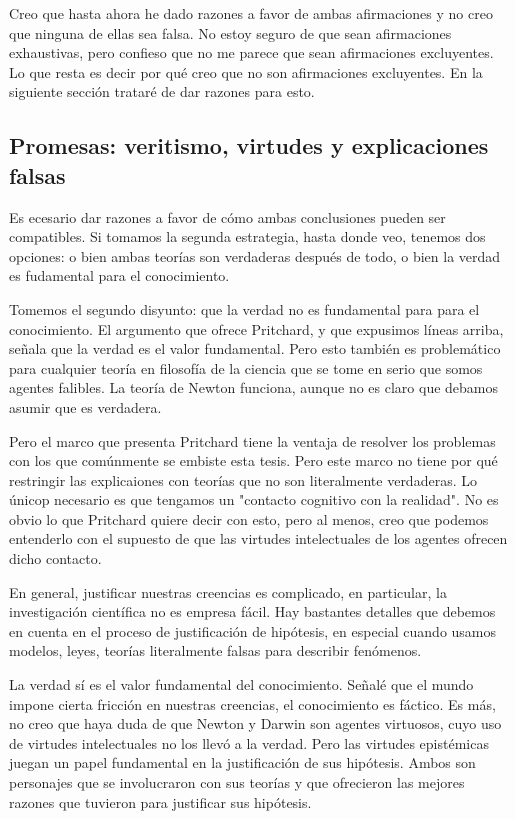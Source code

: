 {{{{{Creo que hasta ahora he dado razones a favor de ambas afirmaciones y no creo que ninguna de ellas sea falsa.
No estoy seguro de que sean afirmaciones exhaustivas, pero confieso que no me parece que sean afirmaciones excluyentes.
Lo que resta es decir por qué creo que no son afirmaciones excluyentes.
En la siguiente sección trataré de dar razones para esto.

\subsection{Promesas: veritismo, virtudes y explicaciones falsas}

Es ecesario dar razones a favor de cómo ambas conclusiones pueden ser compatibles.
Si tomamos la segunda estrategia, hasta donde veo, tenemos dos opciones: o bien ambas teorías son verdaderas después de todo, o bien la verdad es fudamental para el conocimiento.

Tomemos el segundo disyunto: que la verdad no es fundamental para para el conocimiento.
El argumento que ofrece Pritchard, y que expusimos líneas arriba, señala que la verdad es el valor fundamental.
Pero esto también es problemático para cualquier teoría en filosofía de la ciencia que se tome en serio que somos agentes falibles.
La teoría de Newton funciona, aunque no es claro que debamos asumir que es verdadera.

Pero el marco que presenta Pritchard tiene la ventaja de resolver los problemas con los que comúnmente se embiste esta tesis.
Pero este marco no tiene por qué restringir las explicaiones con teorías que no son literalmente verdaderas.
Lo únicop necesario es que tengamos un "contacto cognitivo con la realidad".
No es obvio lo que Pritchard quiere decir con esto, pero al menos, creo que podemos entenderlo con el supuesto de que las virtudes intelectuales de los agentes ofrecen dicho contacto.

En general, justificar nuestras creencias es complicado, en particular, la investigación científica no es empresa fácil.
Hay bastantes detalles que debemos en cuenta en el proceso de justificación de hipótesis, en especial cuando usamos modelos, leyes, teorías literalmente falsas para describir fenómenos.

La verdad sí es el valor fundamental del conocimiento.
Señalé que el mundo impone cierta fricción en nuestras creencias, el conocimiento es fáctico.
Es más, no creo que haya duda de que Newton y Darwin son agentes virtuosos, cuyo uso de virtudes intelectuales no los llevó a la verdad.
Pero las virtudes epistémicas juegan un papel fundamental en la justificación de sus hipótesis.
Ambos son personajes que se involucraron con sus teorías y que ofrecieron las mejores razones que tuvieron para justificar sus hipótesis.

}}}}}
